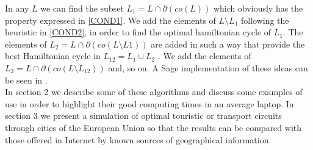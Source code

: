 \documentclass[a4paper]{article} %
\begin{document}
In any $L$ we can find the subset $L_1=L\cap \partial (co(L))$  which obviously has the property expressed in  \ref{COND1}. We add the elements of $L\setminus L_1$ following the heuristic in \ref{COND2}, in order to find the optimal hamiltonian cycle of $L_1$. The elements of $L_2 = L\cap\partial (co(L\setminus L1 ))$ are added in such a way that provide the best Hamiltonian cycle in $L_{12} = L_1\cup L_2$ . We add the elements of $L_3=L\cap \partial (co(L\setminus L_{12}))$ and, so on. A Sage implementation of these ideas can be seen in \cite{A-C-V}.
\\In section 2 we describe some of these algorithms and discuss some examples of use in order to highlight their good computing times in an average laptop. In section 3 we present a simulation of optimal touristic or transport circuits through cities of the European Union so that the results can be compared with those offered in Internet by known sources of geographical information.
\end{document}
